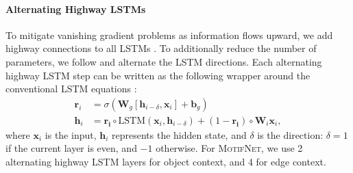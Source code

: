 \documentclass[10pt,twocolumn,letterpaper]{article}
\newcommand{\model}{\textsc{MotifNet}}
\newcommand{\vect}[1]{\mathbf{#1}}   %
\begin{document}
\paragraph{Alternating Highway LSTMs}
To mitigate vanishing gradient problems as information flows upward, we add highway connections to all LSTMs \cite{he2017deep, Srivastava:2015:TVD:2969442.2969505, zhang_highway_lstm}. %
To additionally reduce the number of parameters, we follow \cite{he2017deep} and alternate the LSTM directions. Each alternating highway LSTM step can be written as the following wrapper around the conventional LSTM equations \cite{Hochreiter:1997:LSM:1246443.1246450}:
\begin{align}
\mathbf{r}_i &= \sigma(\mathbf{W}_g[\mathbf{h}_{i-\delta}, \mathbf{x}_i] + \mathbf{b}_g) \\
\mathbf{h}_i &= \mathbf{r_i} \circ \text{LSTM}(\mathbf{x}_i, \mathbf{h}_{i-\delta}) + (1-\mathbf{r_i}) \circ \mathbf{W}_i\mathbf{x}_i,
\end{align}
where $\mathbf{x}_i$ is the input, $\mathbf{h}_i$ represents the hidden state, and $\delta$ is the direction: $\delta=1$ if the current layer is even, and $-1$ otherwise. For \model, we use 2 alternating highway LSTM layers for object context, and 4 for edge context.
\end{document}
